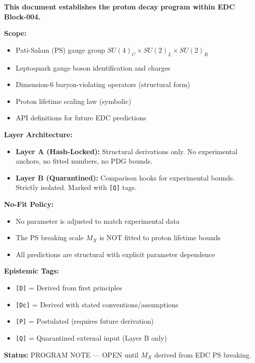 \documentclass[11pt,a4paper]{article}
\newcommand{\tagD}{\textcolor{green!50!black}{\texttt{[D]}}}
\newcommand{\tagDc}{\textcolor{blue!70!black}{\texttt{[Dc]}}}
\newcommand{\tagP}{\textcolor{orange!80!black}{\texttt{[P]}}}
\newcommand{\tagQ}{\textcolor{red!70!black}{\texttt{[Q]}}}
\theoremstyle{definition}
\begin{document}
\begin{readercontract}
\textbf{This document establishes the proton decay program within EDC Block-004.}

\textbf{Scope:}
\begin{itemize}
  \item Pati-Salam (PS) gauge group $SU(4)_C \times SU(2)_L \times SU(2)_R$
  \item Leptoquark gauge boson identification and charges
  \item Dimension-6 baryon-violating operators (structural form)
  \item Proton lifetime scaling law (symbolic)
  \item API definitions for future EDC predictions
\end{itemize}

\textbf{Layer Architecture:}
\begin{itemize}
  \item \textbf{Layer A (Hash-Locked):} Structural derivations only. No experimental
        anchors, no fitted numbers, no PDG bounds.
  \item \textbf{Layer B (Quarantined):} Comparison hooks for experimental bounds.
        Strictly isolated. Marked with \tagQ{} tags.
\end{itemize}

\textbf{No-Fit Policy:}
\begin{itemize}
  \item No parameter is adjusted to match experimental data
  \item The PS breaking scale $M_X$ is NOT fitted to proton lifetime bounds
  \item All predictions are structural with explicit parameter dependence
\end{itemize}

\textbf{Epistemic Tags:}
\begin{itemize}
  \item \tagD{} = Derived from first principles
  \item \tagDc{} = Derived with stated conventions/assumptions
  \item \tagP{} = Postulated (requires future derivation)
  \item \tagQ{} = Quarantined external input (Layer B only)
\end{itemize}

\textbf{Status:} PROGRAM NOTE --- OPEN until $M_X$ derived from EDC PS breaking.
\end{readercontract}
\end{document}
